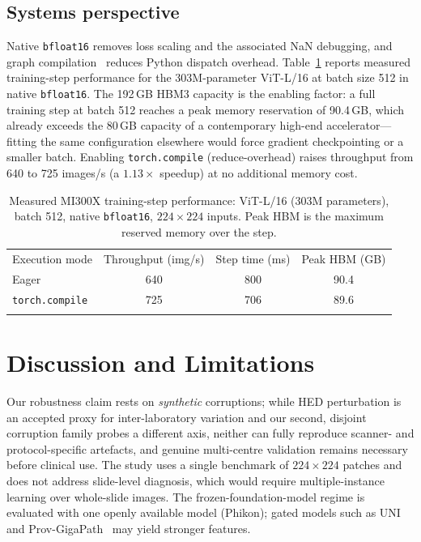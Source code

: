 \documentclass[11pt]{article}
\newcommand{\toprule}{\hline\noalign{\smallskip}}
\newcommand{\midrule}{\noalign{\smallskip}\hline\noalign{\smallskip}}
\newcommand{\bottomrule}{\noalign{\smallskip}\hline}
\begin{document}
\subsection{Systems perspective}
Native \texttt{bfloat16} removes loss scaling and the associated NaN debugging, and graph
compilation~\citep{ansel2024pytorch2} reduces Python dispatch overhead. Table~\ref{tab:systems}
reports measured training-step performance for the 303M-parameter ViT-L/16 at batch size 512 in
native \texttt{bfloat16}. The 192\,GB HBM3 capacity is the enabling factor: a full training step at
batch 512 reaches a peak memory reservation of 90.4\,GB, which already exceeds the 80\,GB capacity
of a contemporary high-end accelerator---fitting the same configuration elsewhere would force
gradient checkpointing or a smaller batch. Enabling \texttt{torch.compile} (reduce-overhead) raises
throughput from 640 to 725 images/s (a $1.13\times$ speedup) at no additional memory cost.

\begin{table}[h]
\centering
\caption{Measured MI300X training-step performance: ViT-L/16 (303M parameters), batch 512, native
\texttt{bfloat16}, $224\times224$ inputs. Peak HBM is the maximum reserved memory over the step.}
\label{tab:systems}
\begin{tabular}{lccc}
\toprule
Execution mode & Throughput (img/s) & Step time (ms) & Peak HBM (GB) \\
\midrule
Eager                       & 640 & 800 & 90.4 \\
\texttt{torch.compile}      & 725 & 706 & 89.6 \\
\bottomrule
\end{tabular}
\end{table}

\section{Discussion and Limitations}
\label{sec:limitations}
Our robustness claim rests on \emph{synthetic} corruptions; while HED perturbation is an accepted
proxy for inter-laboratory variation and our second, disjoint corruption family probes a different
axis, neither can fully reproduce scanner- and protocol-specific artefacts, and genuine multi-centre
validation remains necessary before clinical use. The study
uses a single benchmark of $224\times224$ patches and does not address slide-level diagnosis, which
would require multiple-instance learning over whole-slide images. The frozen-foundation-model
regime is evaluated with one openly available model (Phikon); gated models such as UNI and
Prov-GigaPath~\citep{chen2024uni,xu2024gigapath} may yield stronger features.
\end{document}
